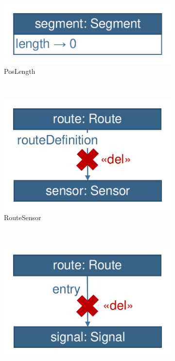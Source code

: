 \begin{figure}
        \centering
        \begin{subfigure}[b]{0.3\textwidth}
        		\centering
                \includegraphics[scale=0.4]{figures/trainbenchmark-transformation-user-poslength}
                \caption{\textsf{PosLength}}
                \label{fig:trainbenchmark-transformation-user-poslength}
        \end{subfigure}
        ~
        \begin{subfigure}[b]{0.3\textwidth}
                \centering
                \includegraphics[scale=0.4]{figures/trainbenchmark-transformation-user-routesensor}
                \caption{\textsf{RouteSensor}}
                \label{fig:trainbenchmark-transformation-user-routesensor}
        \end{subfigure}%
        ~
        \begin{subfigure}[b]{0.3\textwidth}
                \centering
                \includegraphics[scale=0.4]{figures/trainbenchmark-transformation-user-signalneighbor}

\end{subfigure}
\end{figure}
